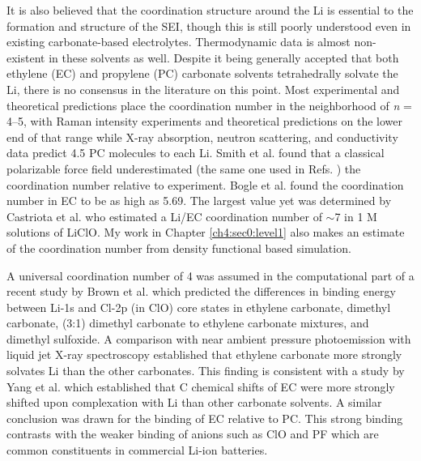 \begin{intro}
   It is also believed that the coordination structure around the Li\sur{+} is essential to the formation and structure of the SEI\cite{smith2014x}, though this is still
   poorly understood even in existing carbonate-based electrolytes. Thermodynamic data is almost non-existent in these solvents as well. Despite it being generally accepted 
   that both ethylene (EC) and propylene (PC) carbonate solvents tetrahedrally solvate the Li\sur{+}, there is no consensus in the literature on this point. Most experimental 
   and theoretical predictions place the coordination number in the neighborhood of \emph{n} = 4--5, with Raman intensity experiments and theoretical predictions on the lower 
   end of that range\cite{allen2014combined,bhatt2010interaction,bhatt2012density,borodin2006litfsi,borodin2009quantum,ganesh2011accurate,hyodo1989raman1,hyodo1989raman2,leung2010liion,li1999theoretical,morita1998raman,nie2013role,soetens1998molecular,takeuchi2009ion}
   while X-ray absorption, neutron scattering, and conductivity data predict 4.5 PC molecules to each Li\sur{+}\cite{kameda2007solvation,kondo2000conductivity,smith2014x}. 
   Smith et al. found that a classical polarizable force field underestimated (the same one used in Refs. \cite{borodin2006litfsi,borodin2009quantum}) the coordination 
   number relative to experiment\cite{smith2014x}. Bogle et al. found the coordination number in EC to be as high as 5.69\cite{bogle2013understanding}. The largest value yet
   was determined by Castriota et al. who estimated a Li/EC coordination number of $\sim$7 in 1 M solutions of LiClO\cite{castriota2003temperature}. My work in
   Chapter \ref{ch4:sec0:level1} also makes an estimate of the coordination number from density functional based simulation.
   
   A universal coordination number of 4 was assumed in the computational part of a recent study by Brown et al. which predicted the differences in binding energy between 
   Li\sur{+}-1s and Cl-2p (in ClO) core states in ethylene carbonate, dimethyl carbonate, (3:1) dimethyl carbonate to ethylene carbonate mixtures, 
   and dimethyl sulfoxide\cite{brown2015ion}. A comparison with near ambient pressure photoemission with liquid jet X-ray spectroscopy established that ethylene carbonate 
   more strongly solvates Li\sur{+} than the other carbonates\cite{brown2015ion}. This finding is consistent with a study by Yang et al. which established that C 
   chemical shifts of EC were more strongly shifted upon complexation with Li\sur{+} than other carbonate solvents\cite{yang2010investigation}. A similar conclusion was drawn 
   for the binding of EC relative to PC\cite{aurbach1992behaviour}. This strong binding contrasts with the weaker binding of anions such as ClO and PF 
   which are common constituents in commercial Li-ion batteries. 
   

\end{intro}
